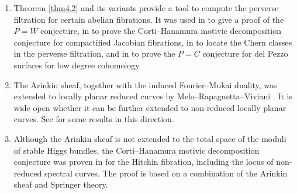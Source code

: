 \documentclass{pspum-l}
\theoremstyle{plain}
\theoremstyle{definition}
\theoremstyle{remark}
\begin{document}
\begin{enumerate}
    \item[(1)]  Theorem \ref{thm4.2} and its variants provide a tool to compute the perverse filtration for certain abelian fibrations. It was used in \cite{MSY} to give a proof of the $P=W$ conjecture, in \cite{MSY} to prove the Corti--Hanamura motivic decomposition conjecture for compactified Jacobian fibrations, in \cite{Ghosh} to locate the Chern classes in the perverse filtration, and in \cite{MSY,PSSZ} to prove the $P=C$ conjecture for del Pezzo surfaces for low degree cohomology.
    \item[(2)] The Arinkin sheaf, together with the induced Fourier--Mukai duality, was extended to locally planar reduced curves by Melo--Rapagnetta--Viviani \cite{MeRV2}. It is wide open whether it can be further extended to non-reduced locally planar curves. See \cite{Li} for some results in this direction. 
    \item[(3)] Although the Arinkin sheaf is not extended to the total space of the moduli of stable Higgs bundles, the Corti--Hanamura motivic decomposition conjecture was proven in \cite{MSY2} for the Hitchin fibration, including the locus of non-reduced spectral curves. The proof is based on a combination of the Arinkin sheaf and Springer theory.
\end{enumerate}
\end{document}
